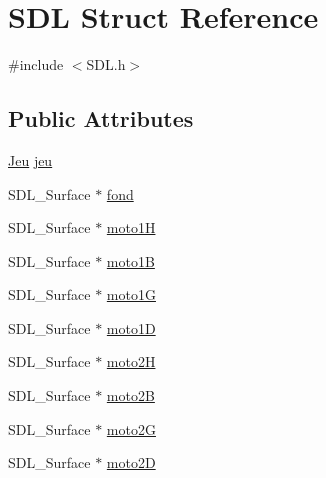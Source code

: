 \hypertarget{structSDL}{\section{S\-D\-L Struct Reference}
\label{structSDL}
}


{\ttfamily \#include $<$S\-D\-L.\-h$>$}

\subsection*{Public Attributes}
\begin{DoxyCompactItemize}
\item 
\hyperlink{structJeu}{Jeu} \hyperlink{structSDL_aed6e34a843f7e278abbc6401e7a86748}{jeu}
\item 
S\-D\-L\-\_\-\-Surface $\ast$ \hyperlink{structSDL_ac8aa1f1d7018a60c1a7440fbf0c67c3e}{fond}
\item 
S\-D\-L\-\_\-\-Surface $\ast$ \hyperlink{structSDL_ac098d302560f0f3ae1e1e850bc106e04}{moto1\-H}
\item 
S\-D\-L\-\_\-\-Surface $\ast$ \hyperlink{structSDL_afba5505e513acdd23d72af6f05fcb607}{moto1\-B}
\item 
S\-D\-L\-\_\-\-Surface $\ast$ \hyperlink{structSDL_af7ebeda1ebe9fcecc1b74877c3e070fa}{moto1\-G}
\item 
S\-D\-L\-\_\-\-Surface $\ast$ \hyperlink{structSDL_aefe2a10ba8936a28bf524206d33b88a7}{moto1\-D}
\item 
S\-D\-L\-\_\-\-Surface $\ast$ \hyperlink{structSDL_a8f0410c7a39fd55e7da1ee0e8c351fea}{moto2\-H}
\item 
S\-D\-L\-\_\-\-Surface $\ast$ \hyperlink{structSDL_ab716b277adfd0902fbba7af5e4268c50}{moto2\-B}
\item 
S\-D\-L\-\_\-\-Surface $\ast$ \hyperlink{structSDL_a2b133fdfed2044880e83945f4582f313}{moto2\-G}
\item 
S\-D\-L\-\_\-\-Surface $\ast$ \hyperlink{structSDL_a5afda5cf42f55a9be258ee2f0605e95b}{moto2\-D}
\end{DoxyCompactItemize}


